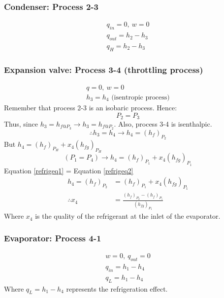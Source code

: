 \subsubsection{Condenser: Process 2-3}
\begin{gather}
  q_{in} = 0, \ w = 0 \\
  q_{out} = h_2 - h_3\\
  q_H = h_2 - h_3
\end{gather}
\subsubsection{Expansion valve: Process 3-4 (throttling process)}
\begin{gather}
  q = 0, \ w = 0\\
  h_3 = h_4 \textrm{ (isentropic process)}
\end{gather}
Remember that process 2-3 is an isobaric process. Hence:
\begin{equation}
  P_2 = P_3
\end{equation}
Thus, since $h_3 = h_{f@P_3} \rightarrow h_3 = h_{f@P_2}$. Also, process 3-4 is isenthalpic.
\begin{equation}
  \therefore h_3 = h_4 \rightarrow h_4 = \left( h_f \right)_{P_2} \label{refrigeq1}
\end{equation}
But $h_4 = \left( h_f \right)_{P_H} + x_4 \left(h_{fg} \right)_{P_H}$
\begin{equation}
  (P_1 = P_4) \rightarrow h_4 = \left( h_f \right)_{P_1} + x_4 \left(h_{fg} \right)_{P_1}
  \label{refrigeq2}
\end{equation}
Equation \ref{refrigeq1} = Equation \ref{refrigeq2}
\begin{align}
  h_4 = \left( h_f \right)_{P_2} & = \left( h_f \right)_{P_1} + x_4 \left(h_{fg} \right)_{P_1}                               \\
  \therefore x_4                 & = \frac{\left( h_f \right)_{P_2} - \left( h_f \right)_{P_1}}{\left( h_{fg} \right)_{P_1}}
\end{align}
Where $x_4$ is the quality of the refrigerant at the inlet of the evaporator.
\subsubsection{Evaporator: Process 4-1}
\begin{gather}
  w = 0, \ q_{out} = 0\\
  q_{in} = h_1 - h_4\\
  q_L = h_1 - h_4
\end{gather}
Where $q_L = h_1 - h_4$ represents the refrigeration effect.
